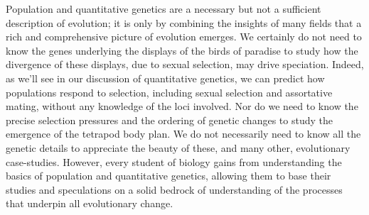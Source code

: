 Population and quantitative genetics are a necessary but not a sufficient description of evolution; it is only by combining the insights of many fields that a rich and comprehensive picture of evolution emerges.
We certainly do not need to know the genes underlying the displays of the birds of paradise to study how the divergence of these displays, due to sexual selection, may drive speciation. Indeed, as we'll see in our discussion of quantitative genetics, we can predict how populations respond to selection, including sexual selection and assortative mating, without any knowledge of the loci involved. Nor do we need to know the precise selection pressures and the ordering of genetic changes to study the emergence of the tetrapod body plan. We do not necessarily need to know all the genetic details to appreciate the beauty of these, and many other, evolutionary case-studies. However, every student of biology gains from understanding the basics of population and quantitative genetics, allowing them to base their studies and speculations on a solid bedrock of understanding of the processes that underpin all evolutionary change.






